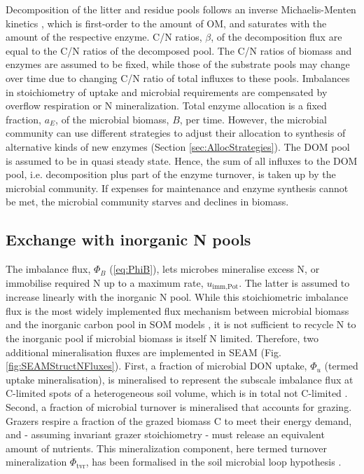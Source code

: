 Decomposition of the litter and residue pools follows an inverse
Michaelis-Menten kinetics \citep{Schimel03}, which is first-order to the amount of OM, and
saturates with the amount of the respective enzyme. C/N ratios, $\beta$, of the
decomposition flux are equal to the C/N ratios of the decomposed pool. The C/N
ratios of biomass and enzymes are assumed to be fixed, while those of the
substrate pools may change over time due to changing C/N ratio of total influxes
to these pools. Imbalances in stoichiometry of uptake and microbial requirements
are compensated by overflow respiration or N mineralization.
Total enzyme allocation is a fixed fraction, $a_E$, of the microbial biomass,
$B$, per time. However, the microbial community can use different strategies to
adjust their allocation to synthesis of alternative kinds of new enzymes
(Section \ref{sec:AllocStrategies}).
The DOM pool is assumed to be in quasi steady state. Hence, the sum of all
influxes to the DOM pool, i.e. decomposition plus part of the enzyme turnover,
is taken up by the microbial community. If expenses for maintenance and enzyme
synthesis cannot be met, the microbial community starves and declines in
biomass.

\subsection{Exchange with inorganic N pools}


The imbalance flux, $\Phi_B$ (\ref{eq:PhiB}), lets microbes mineralise excess N,
or immobilise required N up to a maximum rate, $u_{\operatorname{imm,Pot}}$. The
latter is assumed to increase linearly with the inorganic N pool.
While this stoichiometric imbalance flux is the most widely implemented flux
mechanism between microbial biomass and the inorganic carbon pool in SOM models
\citep{Manzoni09}, it is not sufficient to recycle N to the inorganic pool if
microbial biomass is itself N limited.
Therefore, two additional mineralisation fluxes are implemented in SEAM (Fig.
\ref{fig:SEAMStructNFluxes}). First, a fraction of microbial DON uptake,
$\Phi_u$ (termed uptake mineralisation), is mineralised to represent the
subscale imbalance flux at C-limited spots of a heterogeneous soil volume, which
is in total not C-limited \citep{Manzoni08}.
Second, a fraction of microbial turnover is mineralised that accounts for
grazing. Grazers respire a fraction of the grazed biomass C to meet their energy
demand, and - assuming invariant grazer stoichiometry  - must release an
equivalent amount of nutrients.
This mineralization component, here termed turnover mineralization
$\Phi_{\operatorname{tvr}}$, has been formalised in the soil microbial loop
hypothesis \citep{Clarholm85, Raynaud06}.

